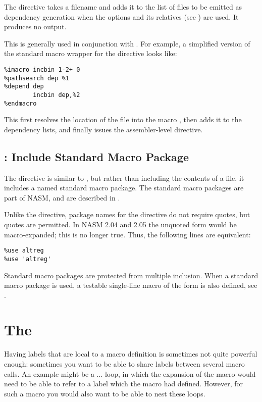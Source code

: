 The  directive takes a filename and adds it to the list of
files to be emitted as dependency generation when the  options
and its relatives (see ) are used. It produces
no output.

This is generally used in conjunction with . For
example, a simplified version of the standard macro wrapper for the
 directive looks like:

\begin{lstlisting}
%imacro incbin 1-2+ 0
%pathsearch dep %1
%depend dep
        incbin dep,%2
%endmacro
\end{lstlisting}

This first resolves the location of the file into the macro ,
then adds it to the dependency lists, and finally issues the
assembler-level  directive.

\subsection{: Include Standard Macro Package}
\label{subsec:use}

The  directive is similar to , but rather than
including the contents of a file, it includes a named standard macro
package.  The standard macro packages are part of NASM, and are
described in .

Unlike the  directive, package names for the 
directive do not require quotes, but quotes are permitted. In NASM
2.04 and 2.05 the unquoted form would be macro-expanded; this is no
longer true. Thus, the following lines are equivalent:

\begin{lstlisting}
%use altreg
%use 'altreg'
\end{lstlisting}

Standard macro packages are protected from multiple inclusion. When a
standard macro package is used, a testable single-line macro of the
form  is also defined,
see .

\section{The }
\label{sec:ctxstack}

Having labels that are local to a macro definition is sometimes not
quite powerful enough: sometimes you want to be able to share labels
between several macro calls. An example might be a  ...
 loop, in which the expansion of the  macro
would need to be able to refer to a label which the  macro
had defined. However, for such a macro you would also want to be
able to nest these loops.

